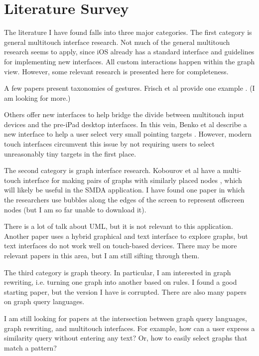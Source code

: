 \section{Literature Survey}

The literature I have found falls into three major categories. The first category is general multitouch interface research. Not much of the general multitouch research seems to apply, since iOS already has a standard interface and guidelines for implementing new interfaces. All custom interactions happen within the graph view. However, some relevant research is presented here for completeness.

A few papers present taxonomies of gestures. Frisch et al provide one example \cite{multitouch:gestures}. (I am looking for more.)

Others offer new interfaces to help bridge the divide between multitouch input devices and the pre-iPad desktop interfaces. In this vein, Benko et al describe a new interface to help a user select very small pointing targets \cite{multitouch:tiny-select}. However, modern touch interfaces circumvent this issue by not requiring users to select unreasonably tiny targets in the first place.

The second category is graph interface research. Kobourov et al have a multi-touch interface for making pairs of graphs with similarly placed nodes \cite{graph-interaction:simultaneousgraphdrawing}, which will likely be useful in the SMDA application. I have found one paper in which the researchers use bubbles along the edges of the screen to represent offscreen nodes (but I am so far unable to download it).

There is a lot of talk about UML, but it is not relevant to this application. Another paper uses a hybrid graphical and text interface to explore graphs, but text interfaces do not work well on touch-based devices. There may be more relevant papers in this area, but I am still sifting through them.

The third category is graph theory. In particular, I am interested in graph rewriting, i.e. turning one graph into another based on rules. I found a good starting paper, but the version I have is corrupted. There are also many papers on graph query languages.

I am still looking for papers at the intersection between graph query languages, graph rewriting, and multitouch interfaces. For example, how can a user express a similarity query without entering any text? Or, how to easily select graphs that match a pattern?
